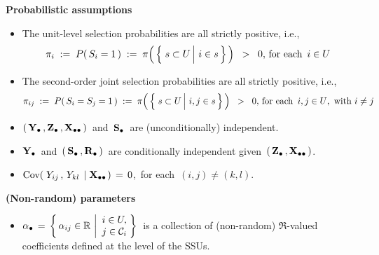 \vskip 0.2cm
\noindent
\textbf{Probabilistic assumptions}
\begin{itemize}
\item
    The unit-level selection probabilities are all strictly positive, i.e.,
    \begin{equation*}
    \pi_{i}
    \; := \;
        P(\,S_{i} = 1\,)
    \; := \;
        \pi\!\left(\,\left\{\,
            \left.
            s \overset{{\color{white}.}}{\subset} U
            \,\right\vert\,
            i \in s
            \,\right\}
        \,\right)
    \;\; > \;\;
        0,\,
    \textnormal{for each \,$i \in U$\,
    }
    \end{equation*}
\item
    The second-order joint selection probabilities are all strictly positive, i.e.,
    \begin{equation*}
    \pi_{ij}
    \; := \;
        P(\,S_{i} = S_{j} = 1\,)
    \; := \;
        \pi\!\left(\,\left\{\,
            \left.
            s \overset{{\color{white}.}}{\subset} U
            \,\right\vert\,
            i, j \in s
            \,\right\}
        \,\right)
    \;\; > \;\;
        0,\,
    \textnormal{for each \,$i,j \in U$,\, with $i \neq j$}
    \end{equation*}
\item
    $\left(\,\mathbf{Y}_{\bullet}\,,\mathbf{Z}_{\bullet}\,,\mathbf{X}_{\bullet\bullet}\,\right)$\, and \,$\mathbf{S}_{\bullet}$\, are (unconditionally) independent.
\item
    $\mathbf{Y}_{\bullet}$\,
    and
    \,$(\,\mathbf{S}_{\bullet}\,,\mathbf{R}_{\bullet}\,)$\,
    are {\color{red}conditionally independent} given \,$\left(\,\mathbf{Z}_{\bullet}\,,\mathbf{X}_{\bullet\bullet}\,\right)$.
\item
    $\textnormal{Cov}\!\left(\;Y_{ij}\,,\,Y_{kl}\;\left\vert\;\mathbf{X}_{\bullet\bullet}\right.\right) \,=\, 0$,\,
    for each \,$(i,j) \neq (k,l)$.
\end{itemize}

\vskip 0.2cm
\noindent
\textbf{(Non-random) parameters}
\begin{itemize}
\item
    $
    \alpha_{\bullet}
    \, = \,
        \left\{\,
            \alpha_{ij} \in \mathbb{R}
            \,\left\vert
            \begin{array}{c} i \in U, \\ j \in \mathcal{C}_{i} \end{array}
            \right.
            \!\!\right\}
    $\,
    is a collection of (non-random)
    $\Re$-valued coefficients defined at the level of the SSUs.
\end{itemize}

